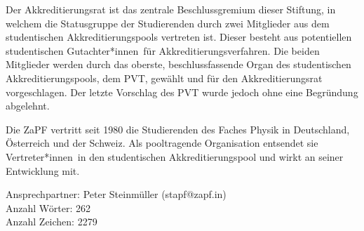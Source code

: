 \documentclass[DIV=calc]{scrartcl}
\newcommand{\gen}{*innen}
\begin{document}
Der Akkreditierungsrat ist das zentrale Beschlussgremium dieser Stiftung, in welchem die Statusgruppe der Studierenden durch zwei Mitglieder aus dem studentischen Akkreditierungspools vertreten ist. Dieser besteht aus potentiellen studentischen Gutachter\gen\ für Akkreditierungsverfahren. Die beiden Mitglieder werden durch das oberste, beschlussfassende Organ des studentischen Akkreditierungspools, dem PVT, gewählt und für den Akkreditierungsrat vorgeschlagen. Der letzte Vorschlag des PVT wurde jedoch ohne eine Begründung abgelehnt.

Die ZaPF vertritt seit 1980 die Studierenden des Faches Physik in Deutschland, Österreich und der Schweiz. Als pooltragende Organisation entsendet sie Vertreter\gen\ in den studentischen Akkreditierungspool und wirkt an seiner Entwicklung mit.

Ansprechpartner: Peter Steinmüller (stapf@zapf.in)\\
Anzahl Wörter: 262\\
Anzahl Zeichen: 2279
\vfill
\end{document}
